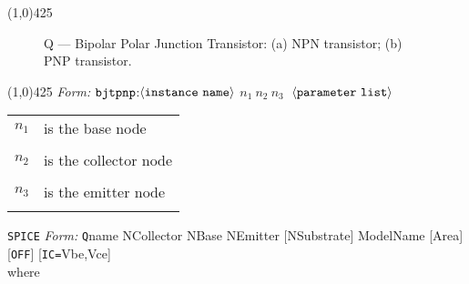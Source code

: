 \documentclass{article}
\begin{document}
\hrulefill\linethickness{0.5mm}\line(1,0){425} \normalsize
\newline
\begin{figure}[h]
\centerline{\epsfxsize=4in} \caption[Q --- bipolar
junction transistor element]{Q --- Bipolar Polar Junction
Transistor: (a) NPN transistor; (b) PNP transistor.}
\end{figure}
\newline
\linethickness{0.5mm}\line(1,0){425}
\newline
\textit{\FDA Form:}
$\tt bjtpnp$:$\langle \tt{instance\ name}\rangle$ $n_1\ n_2\ n_3\
$ $\langle \tt{parameter\ list}\rangle$
\newline
\begin{tabular}{r l}
$n_1$ & is the base node \\
&  \\
$n_2$ & is the collector node \\
&  \\
$n_3$ & is the emitter node \\
& \\
\end{tabular}
\newline
\noindent\texttt{SPICE} \textit{Form:}
\newline
{\tt Q}name  NCollector NBase NEmitter  [NSubstrate]  ModelName
[Area] [{\tt OFF}] {\tt} [{\tt IC=}Vbe,Vce] \\
where \\
\end{document}
